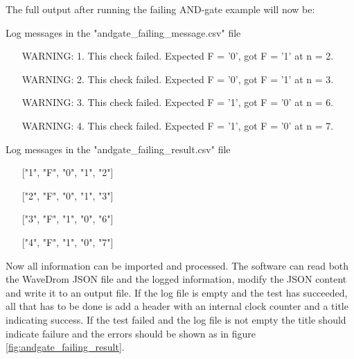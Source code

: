 \npar
The full output after running the failing AND-gate example will now be:
\begin{customenv}
	\caption{Log messages in the "andgate\_failing\_message.csv" file}
	\begin{itemize}
		\item [WARNING: 1.] This check failed. Expected F = '0', got F = '1' at n = 2.
		\item [WARNING: 2.] This check failed. Expected F = '0', got F = '1' at n = 3.
		\item [WARNING: 3.] This check failed. Expected F = '1', got F = '0' at n = 6.
		\item [WARNING: 4.] This check failed. Expected F = '1', got F = '0' at n = 7.
	\end{itemize}
\end{customenv}
\begin{customenv}
	\caption{Log messages in the "andgate\_failing\_result.csv" file}
	\begin{itemize}
		\item [] ["1", "F", "0", "1", "2"]
		\item [] ["2", "F", "0", "1", "3"]
		\item [] ["3", "F", "1", "0", "6"]
		\item [] ["4", "F", "1", "0", "7"]
	\end{itemize}
\end{customenv}\nline
Now all information can be imported and processed. The software can read both the WaveDrom JSON file and the logged information, modify the JSON content and write it to an output file.
\npar
If the log file is empty and the test has succeeded, all that has to be done is add a header with an internal clock counter and a title indicating success. If the test failed and the log file is not empty the title should indicate failure and the errors should be shown as in figure \ref{fig:andgate_failing_result}.\newpage
